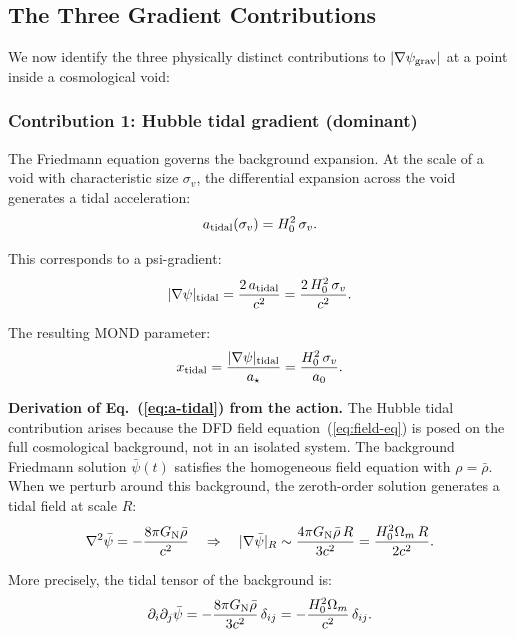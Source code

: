 \documentclass[11pt,a4paper]{article}
\newcommand{\aM}{a_0}
\newcommand{\astar}{a_\star}
\newcommand{\psigrav}{\psi_{\rm grav}}
\newcommand{\GN}{G_{\rm N}}
\newcommand{\Omm}{\Omega_m}
\begin{document}
\subsection{The Three Gradient Contributions}

We now identify the three physically distinct contributions to
$|\nabla\psigrav|$ at a point inside a cosmological void:

\subsubsection{Contribution 1: Hubble tidal gradient (dominant)}

The Friedmann equation governs the background expansion. At the scale
of a void with characteristic size $\sigma_v$, the differential
expansion across the void generates a tidal acceleration:
\begin{equation}
a_{\rm tidal}(\sigma_v) = H_0^2\,\sigma_v.
\label{eq:a-tidal}
\end{equation}

This corresponds to a psi-gradient:
\begin{equation}
|\nabla\psi|_{\rm tidal} = \frac{2\,a_{\rm tidal}}{c^2}
= \frac{2\,H_0^2\,\sigma_v}{c^2}.
\label{eq:grad-tidal}
\end{equation}

The resulting MOND parameter:
\begin{equation}
x_{\rm tidal} = \frac{|\nabla\psi|_{\rm tidal}}{\astar}
= \frac{H_0^2\,\sigma_v}{\aM}.
\label{eq:x-tidal}
\end{equation}

\textbf{Derivation of Eq.~(\ref{eq:a-tidal}) from the action.}
The Hubble tidal contribution arises because the DFD field
equation~(\ref{eq:field-eq}) is posed on the full cosmological
background, not in an isolated system. The background Friedmann
solution $\bar{\psi}(t)$ satisfies the homogeneous field equation
with $\rho = \bar{\rho}$. When we perturb around this background,
the zeroth-order solution generates a tidal field at scale $R$:
\begin{equation}
\nabla^2\bar{\psi} = -\frac{8\pi\GN\bar{\rho}}{c^2}
\quad\Rightarrow\quad
|\nabla\bar{\psi}|_R \sim \frac{4\pi\GN\bar{\rho}\,R}{3c^2}
= \frac{H_0^2\Omm\,R}{2c^2}.
\end{equation}

More precisely, the tidal tensor of the background is:
\begin{equation}
\partial_i\partial_j\bar{\psi} = -\frac{8\pi\GN\bar{\rho}}{3c^2}\,\delta_{ij}
= -\frac{H_0^2\Omm}{c^2}\,\delta_{ij}.
\end{equation}
\end{document}

